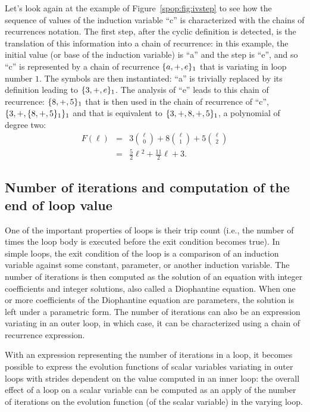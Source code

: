 Let's look again at the example of Figure~\ref{spop:fig:ivstep} to see
how the sequence of values of the induction variable ``c'' is
characterized with the chains of recurrences notation.  The first
step, after the cyclic definition is detected, is the translation of
this information into a chain of recurrence: in this example, the
initial value (or base of the induction variable) is ``a'' and the
step is ``e'', and so ``c'' is represented by a chain of recurrence
$\{a, +, e\}_1$ that is variating in loop number $1$.  The symbols
are then instantiated: ``a'' is trivially replaced by its definition
leading to $\{3, +, e\}_1$.  The analysis of ``e'' leads to this
chain of recurrence: $\{8, +, 5\}_1$ that is then used in the
chain of recurrence of ``c'', $\{3, +, \{8, +, 5\}_1\}_1$ and
that is equivalent to $\{3, +, 8, +, 5\}_1$, a polynomial of
degree two:
\begin{eqnarray*}
  F(\ell)
  &=& 3\binom{\ell}{0} + 8\binom{\ell}{1} + 5\binom{\ell}{2} \\
  &=& \frac{5}{2}\ell{}^2+\frac{11}{2}\ell + 3.
\end{eqnarray*}

\subsection{Number of iterations and computation of the end of loop value}

One of the important properties of loops is their trip count (i.e.,
the number of times the loop body is executed before the exit
condition becomes true).  In simple loops, the exit condition of the
loop is a comparison of an induction variable against some constant,
parameter, or another induction variable.  The number of iterations is
then computed as the solution of an equation with integer coefficients
and integer solutions, also called a Diophantine equation.  When one
or more coefficients of the Diophantine equation are parameters, the
solution is left under a parametric form.  The number of iterations
can also be an expression variating in an outer loop, in which case,
it can be characterized using a chain of recurrence expression.

With an expression representing the number of iterations in a loop, it
becomes possible to express the evolution functions of scalar
variables variating in outer loops with strides dependent on the value
computed in an inner loop: the overall effect of a loop on a scalar
variable can be computed as an apply of the number of iterations on
the evolution function (of the scalar variable) in the varying loop.

